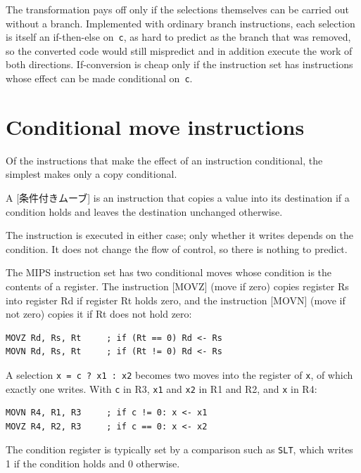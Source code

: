 \documentclass[../main.tex]{subfiles}
\begin{document}
The transformation pays off only if the selections themselves can be carried
out without a branch.  Implemented with ordinary branch instructions, each
selection is itself an if-then-else on~\texttt{c}, as hard to predict as the
branch that was removed, so the converted code would still mispredict and in
addition execute the work of both directions.  If-conversion is cheap only if
the instruction set has instructions whose effect can be made conditional
on~\texttt{c}.

\section{Conditional move instructions}
\label{sec:l05-cmov}

Of the instructions that make the effect of an instruction conditional, the
simplest makes only a copy conditional.

\begin{definition}
  \label{def:l05-cmov}
  A [条件付きムーブ] is an instruction that copies a
  value into its destination if a condition holds and leaves the destination
  unchanged otherwise.
\end{definition}

The instruction is executed in either case; only whether it writes depends on
the condition.  It does not change the flow of control, so there is nothing to
predict.

The MIPS instruction set has two conditional moves whose condition is the
contents of a register.  The instruction [MOVZ] (move if zero)
copies register Rs into register Rd if register Rt holds zero, and the
instruction [MOVN] (move if not zero) copies it if Rt does not hold
zero:
\begin{lstlisting}[language={[x86masm]Assembler}, numbers=none]
MOVZ Rd, Rs, Rt     ; if (Rt == 0) Rd <- Rs
MOVN Rd, Rs, Rt     ; if (Rt != 0) Rd <- Rs
\end{lstlisting}
A selection \texttt{x = c ? x1 : x2} becomes two moves into the register of
\texttt{x}, of which exactly one writes.  With \texttt{c} in R3, \texttt{x1}
and \texttt{x2} in R1 and R2, and \texttt{x} in R4:
\begin{lstlisting}[language={[x86masm]Assembler}, numbers=none]
MOVN R4, R1, R3     ; if c != 0: x <- x1
MOVZ R4, R2, R3     ; if c == 0: x <- x2
\end{lstlisting}
The condition register is typically set by a comparison such as
\texttt{SLT}, which writes 1 if the condition holds and 0
otherwise.
\end{document}
